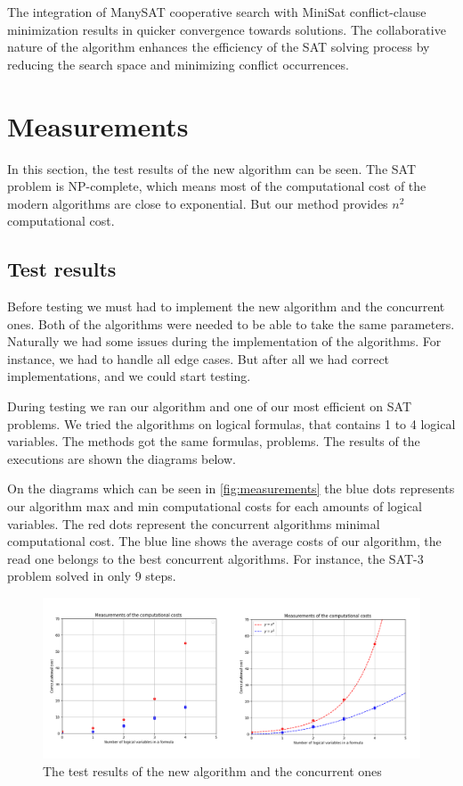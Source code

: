 \documentclass{article}
\begin{document}
The integration of ManySAT cooperative search with MiniSat conflict-clause minimization results in quicker convergence towards solutions. The collaborative nature of the algorithm enhances the efficiency of the SAT solving process by reducing the search space and minimizing conflict occurrences.

\section{Measurements}
\label{sec:measurements}

In this section, the test results of the new algorithm can be seen. The SAT problem is NP-complete, which means most of the computational cost of the modern algorithms are close to exponential. But our method provides $n^{2}$ computational cost.

\subsection{Test results}
Before testing we must had to implement the new algorithm and the concurrent ones. Both of the algorithms were needed to be able to take the same parameters. Naturally we had some issues during the implementation of the algorithms. For instance, we had to handle all edge cases. But after all we had correct implementations, and we could start testing.

During testing we ran our algorithm and one of our most efficient on SAT problems. We tried the algorithms on logical formulas, that contains 1 to 4 logical variables. The methods got the same formulas, problems. The results of the executions are shown the diagrams below.

On the diagrams which can be seen in \autoref{fig:measurements} the blue dots represents our algorithm max and min computational costs for each amounts of logical variables. The red dots represent the concurrent algorithms minimal computational cost. The blue line shows the average costs of our algorithm, the read one belongs to the best concurrent algorithms. For instance, the SAT-3 problem solved in only 9 steps.

\begin{figure}[h]
    \centering
    \includegraphics[width=1\linewidth]{img/measurements.png}
    \caption{The test results of the new algorithm and the concurrent ones}
	\label{fig:measurements}
\end{figure}
\end{document}
